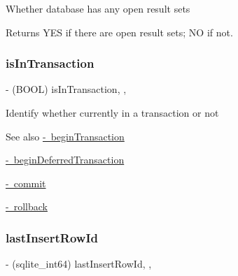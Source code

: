 Whether database has any open result sets

\begin{DoxyReturn}{Returns}
{\ttfamily Y\+ES} if there are open result sets; {\ttfamily NO} if not. 
\end{DoxyReturn}
\mbox{\label{interface_o_p_t_l_y_f_m_d_b_database_aad9ac9a8b17ad02d9595a11567ceb404}} 
\subsubsection{\texorpdfstring{is\+In\+Transaction}{isInTransaction}}
{\footnotesize\ttfamily -\/ (B\+O\+OL) is\+In\+Transaction\hspace{0.3cm}{\ttfamily [read]}, {\ttfamily [nonatomic]}, {\ttfamily [assign]}}

Identify whether currently in a transaction or not

\begin{DoxySeeAlso}{See also}
\mbox{\hyperlink{interface_o_p_t_l_y_f_m_d_b_database_aa49b282394be0570adb7ae4b8544b6b5}{-\/ begin\+Transaction}} 

\mbox{\hyperlink{interface_o_p_t_l_y_f_m_d_b_database_ae42926b392d7862b8e4a2c7da6e12552}{-\/ begin\+Deferred\+Transaction}} 

\mbox{\hyperlink{interface_o_p_t_l_y_f_m_d_b_database_a13149a1989b1cdb7a6f7b8f2b4207cfd}{-\/ commit}} 

\mbox{\hyperlink{interface_o_p_t_l_y_f_m_d_b_database_a511569a0ee0c82136255920ebe9d28e6}{-\/ rollback}} 
\end{DoxySeeAlso}
\mbox{\label{interface_o_p_t_l_y_f_m_d_b_database_af5291c062e84adebb1d7ca5319d33166}} 
\subsubsection{\texorpdfstring{last\+Insert\+Row\+Id}{lastInsertRowId}}
{\footnotesize\ttfamily -\/ (sqlite\+\_\+int64) last\+Insert\+Row\+Id\hspace{0.3cm}{\ttfamily [read]}, {\ttfamily [nonatomic]}, {\ttfamily [assign]}}


